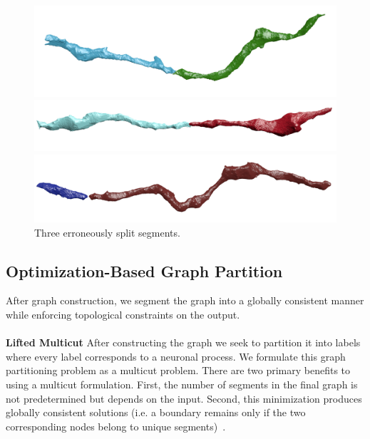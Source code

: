\begin{figure}[t]
	\centering
	\begin{minipage}{0.32\linewidth}
		\includegraphics[width=\linewidth]{./figures/split_error1.png}		
	\end{minipage}
	\hfill
	\begin{minipage}{0.32\linewidth}
		\includegraphics[width=\linewidth]{./figures/split_error2.png}				
	\end{minipage}
	\hfill
	\begin{minipage}{0.32\linewidth}
		\includegraphics[width=\linewidth]{./figures/split_error3.png}
	\end{minipage}
	\caption{Three erroneously split segments.}
	\label{fig:merge_candidates}
\end{figure}
\subsection{Optimization-Based Graph Partition}

After graph construction, we segment the graph into a globally consistent manner while enforcing topological constraints on the output.
\\~\\
\noindent\textbf{Lifted Multicut}
After constructing the graph we seek to partition it into labels where every label corresponds to a neuronal process. 
We formulate this graph partitioning problem as a multicut problem.
There are two primary benefits to using a multicut formulation. 
First, the number of segments in the final graph is not predetermined but depends on the input. 
Second, this minimization produces globally consistent solutions (i.e. a boundary remains only if the two corresponding nodes belong to unique segments)~\cite{keuper2015efficient}.

